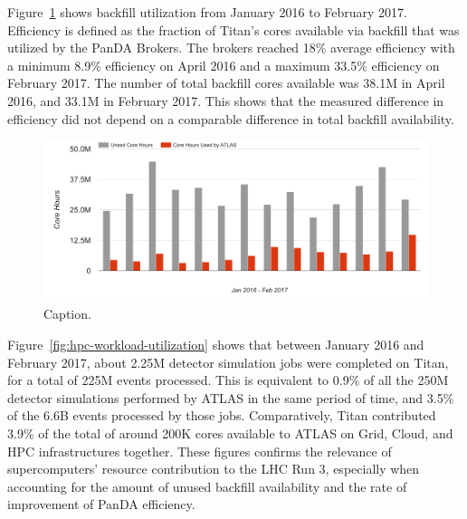 Figure~\ref{fig:backfill-utilization} shows backfill utilization from January
2016 to February 2017.  Efficiency is defined as the fraction of Titan’s cores available
via backfill that was utilized by the PanDA Brokers.  The brokers reached 18\% average efficiency
 with a minimum 8.9\% efficiency on April 2016 and a maximum 33.5\%
efficiency on February 2017. The number of total backfill cores available was
38.1M in April 2016, and 33.1M in February 2017. This shows that the measured
difference in efficiency did not depend on a comparable difference in total
backfill availability.

\begin{figure}[htp]
\includegraphics[clip,width=\columnwidth]{figures/backfill_consumption.png}
\caption{Caption. }
\label{fig:backfill-utilization}
\end{figure}

Figure~\ref{fig:hpc-workload-utilization} shows that between January 2016 and
February 2017, about 2.25M detector simulation jobs were completed on Titan, for
a total of 225M events processed. This is equivalent to 0.9\% of all the 250M
detector simulations performed by ATLAS in the same period of time, and 3.5\% of
the 6.6B events processed by those jobs. Comparatively, Titan contributed 3.9\%
of the total of around 200K cores available to ATLAS on Grid, Cloud, and HPC
infrastructures together. These figures confirms the relevance of
supercomputers' resource contribution to the LHC Run 3, especially when
accounting for the amount of unused backfill availability and the rate of
improvement of PanDA efficiency.

